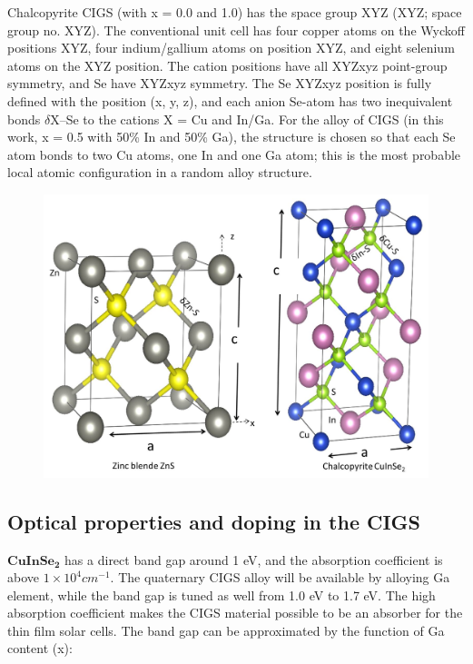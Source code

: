 \documentclass[a4paper, 12pt, titlepage,oneside,drop]{kthesis}
\begin{document}
Chalcopyrite CIGS (with x = 0.0 and 1.0) has the space group XYZ (XYZ; space group no. XYZ).
The conventional unit cell has four copper atoms on the Wyckoff positions XYZ, four indium/gallium atoms on position XYZ, and eight selenium atoms on the XYZ position. 
The cation positions have all XYZxyz point-group symmetry, and Se have XYZxyz symmetry. 
The Se XYZxyz position is fully defined with the position (x, y, z), and each anion Se-atom has two inequivalent bonds $\delta$X–Se to the cations X = Cu and In/Ga. 
For the alloy of CIGS (in this work, x = 0.5 with 50\% In and 50\% Ga), the structure is chosen so that each Se atom bonds to two Cu atoms, one In and one Ga atom;
this is the most probable local atomic configuration in a random alloy structure.


\begin{figure}[H]
\centering
\includegraphics[scale=0.4]{structureciise1.jpg} 
\caption{}
\label{crystal_cigs}
\end{figure}






\subsection{Optical properties and doping in the CIGS}
$\mathbf {CuInSe_{2}}$ has a direct band gap around 1 eV, and the absorption coefficient is above $1 \times 10^{4} cm^{-1}$. The quaternary CIGS alloy will be available by alloying Ga element, while the band gap is tuned as well from 
1.0 eV to 1.7 eV. The high absorption coefficient makes the CIGS material possible to be an absorber for the thin film solar cells. The band gap can be approximated by the function of Ga content (x):
\end{document}
